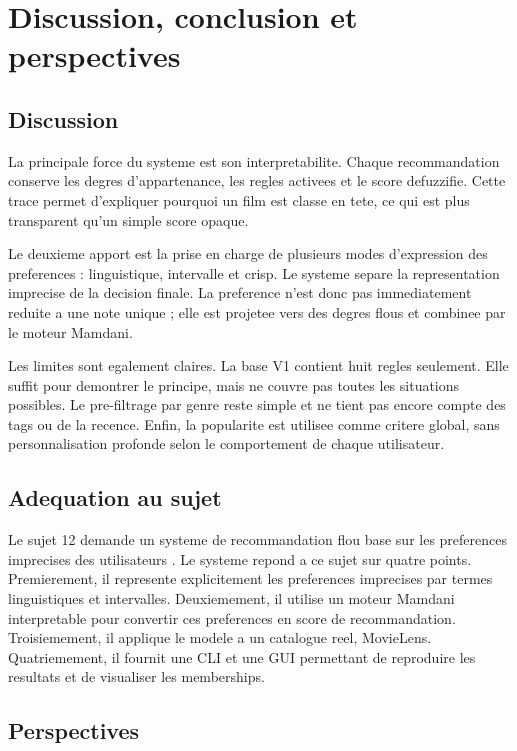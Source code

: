 \section{Discussion, conclusion et perspectives}

\subsection{Discussion}

La principale force du systeme est son interpretabilite. Chaque recommandation conserve les degres d'appartenance, les regles activees et le score defuzzifie. Cette trace permet d'expliquer pourquoi un film est classe en tete, ce qui est plus transparent qu'un simple score opaque.

Le deuxieme apport est la prise en charge de plusieurs modes d'expression des preferences : linguistique, intervalle et crisp. Le systeme separe la representation imprecise de la decision finale. La preference n'est donc pas immediatement reduite a une note unique ; elle est projetee vers des degres flous et combinee par le moteur Mamdani.

Les limites sont egalement claires. La base V1 contient huit regles seulement. Elle suffit pour demontrer le principe, mais ne couvre pas toutes les situations possibles. Le pre-filtrage par genre reste simple et ne tient pas encore compte des tags ou de la recence. Enfin, la popularite est utilisee comme critere global, sans personnalisation profonde selon le comportement de chaque utilisateur.

\subsection{Adequation au sujet}

Le sujet 12 demande un systeme de recommandation flou base sur les preferences imprecises des utilisateurs \cite{kasereka2026}. Le systeme repond a ce sujet sur quatre points. Premierement, il represente explicitement les preferences imprecises par termes linguistiques et intervalles. Deuxiemement, il utilise un moteur Mamdani interpretable pour convertir ces preferences en score de recommandation. Troisiemement, il applique le modele a un catalogue reel, MovieLens. Quatriemement, il fournit une CLI et une GUI permettant de reproduire les resultats et de visualiser les memberships.

\subsection{Perspectives}

